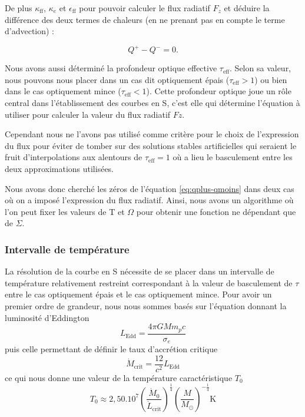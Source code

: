 De plus $\kappa_\textrm{ff}$, $\kappa_{e}$ et $\epsilon_\textrm{ff}$ pour pouvoir calculer le flux radiatif $F_z$ et déduire la différence des deux termes de chaleurs (en ne prenant pas en compte le terme d'advection) :

\begin{equation} 
\label{eq:qplus-qmoins}
Q^+ - Q^- = 0. 
\end{equation}

Nous avons aussi déterminé la profondeur optique effective $\tau_\textrm{eff}$. Selon sa valeur, nous pouvons nous placer dans un cas dit optiquement épais ($\tau_\textrm{eff} > 1$) ou bien dans le cas optiquement mince  ($\tau_\textrm{eff} < 1$). Cette profondeur optique joue un rôle central dans l'établissement des courbes en S, c'est elle qui détermine l'équation à utiliser pour calculer la valeur du flux radiatif $Fz$.

Cependant nous ne l'avons pas utilisé comme critère pour le choix de l'expression du flux pour éviter de tomber sur des solutions stables artificielles qui seraient le fruit d'interpolations aux alentours de $\tau_\textrm{eff} = 1$ où a lieu le basculement entre les deux approximations utilisées. 

Nous avons donc cherché les zéros de l'équation \eqref{eq:qplus-qmoins} dans deux cas où on a imposé l'expression du flux radiatif. Ainsi, nous avons un algorithme où l'on peut fixer les valeurs de T et $\Omega$ pour obtenir une fonction ne dépendant que de $\Sigma$.

\subsubsection{Intervalle de température}
La résolution de la courbe en S nécessite de se placer dans un intervalle de température relativement restreint correspondant à la valeur de basculement de $\tau$ entre le cas optiquement épais et le cas optiquement mince.
Pour avoir un premier ordre de grandeur, nous nous sommes basés sur l'équation donnant la luminosité d'Eddington 
\begin{equation}
L_\mathrm{Edd} = \frac{4\pi GMm_pc}{\sigma_e}
\end{equation}
puis celle permettant de définir le taux d’accrétion critique 
\begin{equation}
\dot{M}_\mathrm{crit} = \frac{12}{c^2}L_\mathrm{Edd} 
\end{equation}
ce qui nous donne une valeur de la température caractéristique $T_0$
\begin{equation}
T_0 \approx 2,50.10^7\left(\frac{\dot{M}_0}{\dot{L}_\mathrm{crit}}\right)^{\frac{1}{4}}\left(\frac{M}{M_\odot}\right)^{-\frac{1}{4}} \mathrm{K}
\end{equation}

